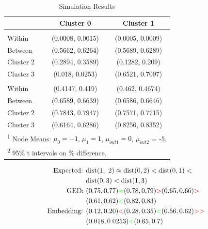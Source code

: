 \documentclass[
  11pt,
  letterpaper,
]{article}
\begin{document}
\begin{longtable}[t]{lcc}
\caption{Simulation Results} \label{tab-sim}\\
\toprule
  & Cluster 0 & Cluster 1\\
\midrule
\addlinespace[0.3em]
\multicolumn{3}{l}{\textbf{Embeddings}}\\
\hspace{1em}Within & (0.0008, 0.0015) & (0.0005, 0.0009)\\
\hspace{1em}Between & (0.5662, 0.6264) & (0.5689, 0.6289)\\
\hspace{1em}Cluster 2 & (0.2894, 0.3589) & (0.1282, 0.209)\\
\hspace{1em}Cluster 3 & (0.018, 0.0253) & (0.6521, 0.7097)\\
\addlinespace[0.3em]
\multicolumn{3}{l}{\textbf{GED}}\\
\hspace{1em}Within & (0.4147, 0.419) & (0.462, 0.4674)\\
\hspace{1em}Between & (0.6589, 0.6639) & (0.6586, 0.6646)\\
\hspace{1em}Cluster 2 & (0.7843, 0.7947) & (0.7571, 0.7715)\\
\hspace{1em}Cluster 3 & (0.6164, 0.6286) & (0.8256, 0.8352)\\
\bottomrule
\multicolumn{3}{l}{\rule{0pt}{1em}\textsuperscript{1} Node Means: $\mu_0 = -1$, $\mu_1 = 1$, $\mu_{out1} = 0$, 
                    $\mu_{out2}$ = -5.}\\
\multicolumn{3}{l}{\rule{0pt}{1em}\textsuperscript{2} 95\% t intervals on \% difference.}\\
\end{longtable}

\begin{equation} \label{eq-sim}
    \begin{split}
        \text{Expected: } &\text{dist}(1,\ 2) \approx \text{dist}(0, 2) < \text{dist}(0, 1) < \\ 
        &\text{dist}(0, 3) < \text{dist}(1, 3) \\ 
        \text{GED: }&(0.75, 0.77) \textcolor{green}{\approx} (0.78, 0.79) 
                    \textcolor{red}{>} (0.65, 0.66) \textcolor{red}{>} \\
                    &(0.61, 0.62) \textcolor{green}{<} (0.82, 0.83) \\
        \text{Embedding: }&(0.12, 0.20) \textcolor{red}{<} (0.28, 0.35) 
                    \textcolor{green}{<} (0.56, 0.62) \textcolor{red}{>>} \\
                    &(0.018, 0.0253) \textcolor{green}{<} (0.65, 0.7)
        \end{split}
\end{equation}
\end{document}
